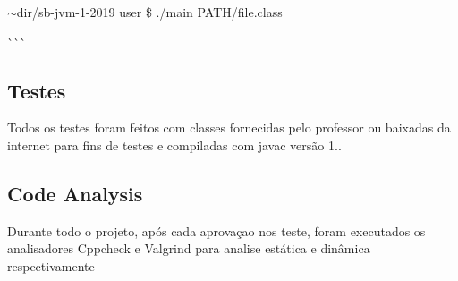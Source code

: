 $\sim$dir/sb-\/jvm-\/1-\/2019 user \$ ./main P\+A\+T\+H/file.\+class

\`{}\`{}\`{}

\subsection*{Testes}

Todos os testes foram feitos com classes fornecidas pelo professor ou baixadas da internet para fins de testes e compiladas com javac versão 1..

\subsection*{Code Analysis}

Durante todo o projeto, após cada aprovaçao nos teste, foram executados os analisadores Cppcheck e Valgrind para analise estática e dinâmica respectivamente 